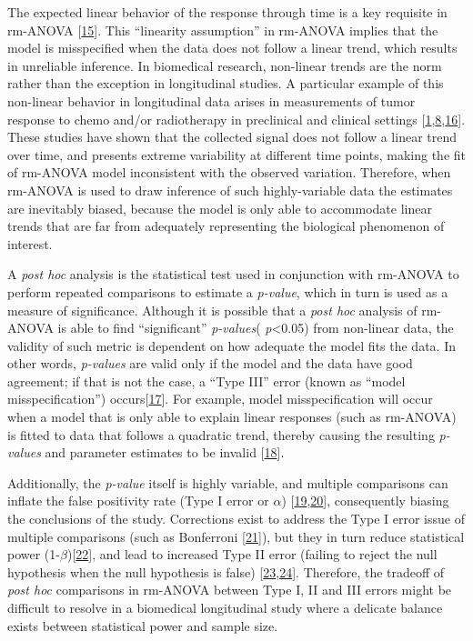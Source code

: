 \documentclass[
]{article}
\begin{document}
The expected linear behavior of the response through time is a key requisite in rm-ANOVA {[}\protect\hyperlink{ref-pinheiro2006}{15}{]}. This ``linearity assumption'' in rm-ANOVA implies that the model is misspecified when the data does not follow a linear trend, which results in unreliable inference. In biomedical research, non-linear trends are the norm rather than the exception in longitudinal studies. A particular example of this non-linear behavior in longitudinal data arises in measurements of tumor response to chemo and/or radiotherapy in preclinical and clinical settings {[}\protect\hyperlink{ref-roblyer2011}{1},\protect\hyperlink{ref-skala2010}{8},\protect\hyperlink{ref-vishwanath2009}{16}{]}. These studies have shown that the collected signal does not follow a linear trend over time, and presents extreme variability at different time points, making the fit of rm-ANOVA model inconsistent with the observed variation. Therefore, when rm-ANOVA is used to draw inference of such highly-variable data the estimates are inevitably biased, because the model is only able to accommodate linear trends that are far from adequately representing the biological phenomenon of interest.

A \emph{post hoc} analysis is the statistical test used in conjunction with rm-ANOVA to perform repeated comparisons to estimate a \emph{p-value}, which in turn is used as a measure of significance.
Although it is possible that a \emph{post hoc} analysis of rm-ANOVA is able to find ``significant'' \emph{p-values}( \emph{p}\textless0.05) from non-linear data, the validity of such metric is dependent on how adequate the model fits the data. In other words, \emph{p-values} are valid only if the model and the data have good agreement; if that is not the case, a ``Type III'' error (known as ``model misspecification'') occurs{[}\protect\hyperlink{ref-dennis2019}{17}{]}. For example, model misspecification will occur when a model that is only able to explain linear responses (such as rm-ANOVA) is fitted to data that follows a quadratic trend, thereby causing the resulting \emph{p-values} and parameter estimates to be invalid {[}\protect\hyperlink{ref-wang2019}{18}{]}.

Additionally, the \emph{p-value} itself is highly variable, and multiple comparisons can inflate the false positivity rate (Type I error or \(\alpha\)) {[}\protect\hyperlink{ref-liu2010}{19},\protect\hyperlink{ref-halsey2015}{20}{]}, consequently biasing the conclusions of the study. Corrections exist to address the Type I error issue of multiple comparisons (such as Bonferroni {[}\protect\hyperlink{ref-abdi2010}{21}{]}), but they in turn reduce statistical power (1-\(\beta\)){[}\protect\hyperlink{ref-nakagawa2004}{22}{]}, and lead to increased Type II error (failing to reject the null hypothesis when the null hypothesis is false) {[}\protect\hyperlink{ref-gelman2012}{23},\protect\hyperlink{ref-albers2019}{24}{]}. Therefore, the tradeoff of \emph{post hoc} comparisons in rm-ANOVA between Type I, II and III errors might be difficult to resolve in a biomedical longitudinal study where a delicate balance exists between statistical power and sample size.
\end{document}
